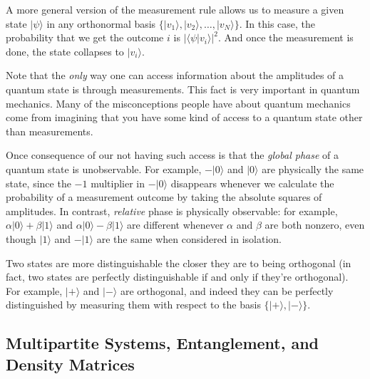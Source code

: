 \documentclass[12pt]{report}
\theoremstyle{plain}
\theoremstyle{definition}
\renewcommand{\ket}[1]{|#1\rangle}
\newcommand{\braket}[2]{\langle#1|#2\rangle}
\begin{document}
A more general version of the measurement rule allows us to measure a given state $\ket{\psi}$ in any orthonormal basis $\{\ket{v_1}, \ket{v_2}, \ldots, \ket{v_N}\}$. In this case, the probability that we get the outcome $i$ is $|\braket{\psi}{v_i}|^2$. And once the measurement is done, the state collapses to $\ket{v_i}$.

Note that the \emph{only} way one can access information about the amplitudes of a quantum state is through measurements. This fact is very important in quantum mechanics. Many of the misconceptions people have about quantum mechanics come from imagining that you have some kind of access to a quantum state other than measurements.

Once consequence of our not having such access is that the \emph{global phase} of a quantum state is unobservable. For example, $-\ket{0}$ and $\ket{0}$ are physically the same state, since the $-1$ multiplier in $-\ket{0}$ disappears whenever we calculate the probability of a measurement outcome by taking the absolute squares of amplitudes.  In contrast, \emph{relative} phase is physically observable: for example, $\alpha \ket{0}+\beta \ket{1}$ and $\alpha \ket{0}-\beta \ket{1}$ are different whenever $\alpha$ and $\beta$ are both nonzero, even though $\ket{1}$ and $-\ket{1}$ are the same when considered in isolation.

Two states are more distinguishable the closer they are to being orthogonal (in fact, two states are perfectly distinguishable if and only if they're orthogonal). For example, $\ket{+}$ and $\ket{-}$ are orthogonal, and indeed they can be perfectly distinguished by measuring them with respect to the basis $\{\ket{+}, \ket{-}\}$.


\subsection{Multipartite Systems, Entanglement, and Density Matrices}
\end{document}

